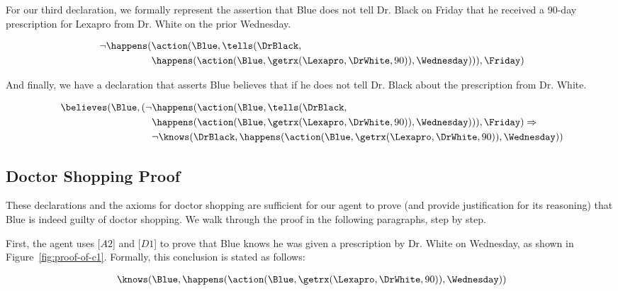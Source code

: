 \noindent For our third declaration, we formally represent the assertion that Blue does not tell Dr. Black on Friday that he received a 90-day prescription for Lexapro from Dr. White on the prior Wednesday.
\begin{footnotesize}
\begin{align*}
[D3] \ \neg\happens(&\action(\Blue,\tells(\DrBlack, \\
	& \happens(\action(\Blue,\getrx(\Lexapro,\DrWhite,90)),\Wednesday))),\Friday)
\end{align*}
\end{footnotesize}

\noindent And finally, we have a declaration that asserts Blue believes that if he does not tell Dr. Black about the prescription from Dr. White.
\begin{footnotesize}
\begin{align*}
[D4] \ \believes(\Blue,(\neg&\happens(\action(\Blue,\tells(\DrBlack,\\
	& \happens(\action(\Blue,\getrx(\Lexapro,\DrWhite,90)),\Wednesday))),\Friday) \Rightarrow \\
	& \neg\knows(\DrBlack,\happens(\action(\Blue,\getrx(\Lexapro,\DrWhite,90)),\Wednesday))
\end{align*}
\end{footnotesize}

\subsection{Doctor Shopping Proof}

These declarations and the axioms for doctor shopping are sufficient for our agent to prove (and provide justification for its reasoning) that Blue is indeed guilty of doctor shopping.  We walk through the proof in the following paragraphs, step by step.



First, the agent uses [$A2$] and [$D1$] to prove that Blue knows he was given a prescription by Dr. White on Wednesday, as shown in Figure~\ref{fig:proof-of-c1}.  Formally, this conclusion is stated as follows:
\begin{footnotesize}
\begin{align*}
[C1] \ \knows(\Blue,\happens(\action(\Blue,\getrx(\Lexapro,\DrWhite,90)),\Wednesday))
\end{align*}
\end{footnotesize}


